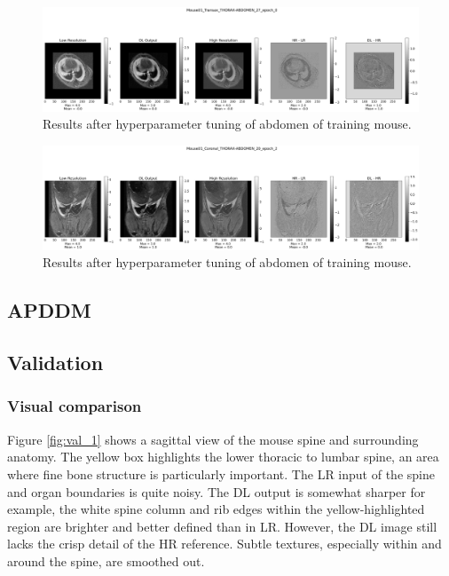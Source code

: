 \documentclass[twocolumn]{article}
\begin{document}
\begin{figure}
    \centering
    \includegraphics[width=1\linewidth]{Mouse01_Transax_THORAX-ABDOMEN_27_epoch_0.png}
    \caption{Results after hyperparameter tuning of abdomen of training mouse.}
    \label{fig:second_transax}
\end{figure}

\begin{figure}
    \centering
    \includegraphics[width=1\linewidth]{Mouse01_Coronal_THORAX-ABDOMEN_20_epoch_2.png}
    \caption{Results after hyperparameter tuning of abdomen of training mouse.}
    \label{fig:second_coronal}
\end{figure}
   

\subsection{APDDM}

\subsection{Validation}



\subsubsection{Visual comparison}
Figure \ref{fig:val_1} shows a sagittal view of the mouse spine and surrounding anatomy. 
The yellow box highlights the lower thoracic to lumbar spine, an area where fine bone structure is particularly important. 
The LR input of the spine and organ boundaries is quite noisy. 
The DL output is somewhat sharper for example, the white spine column and rib edges within the yellow-highlighted region are brighter and better defined than in LR. 
However, the DL image still lacks the crisp detail of the HR reference. 
Subtle textures, especially within and around the spine, are smoothed out.
\end{document}
